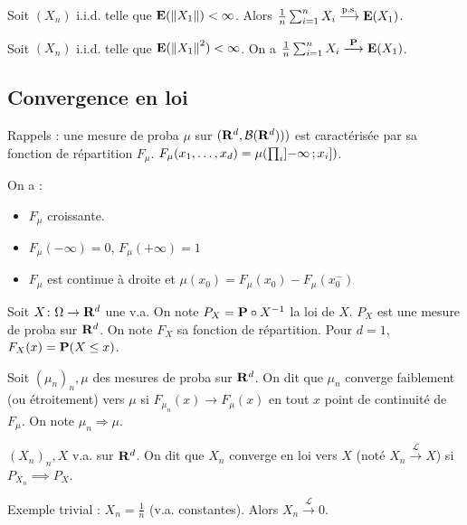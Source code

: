 	\begin{thm}
		Soit $(X_n)$ i.i.d. telle que $\mathbf{E}(\left\lVert X_1\right\rVert) < \infty$.
		Alors $\frac{1}{n} \sum_{i = 1}^n X_i \overset{\text{p.s.}}{\longrightarrow} \mathbf{E}(X_1)$.
	\end{thm}

	\begin{thm}
		Soit $(X_n)$ i.i.d. telle que $\mathbf{E}(\left\lVert X_1\right\rVert^2) < \infty$.
		On a $\frac{1}{n} \sum_{i = 1}^n X_i \overset{\mathbf{P}}{\longrightarrow} \mathbf{E}(X_1)$.
	\end{thm}


\subsection{Convergence en loi}

	Rappels : une mesure de proba $\mu$ sur $(\mathbf{R}^d, \mathcal{B}(\mathbf{R}^d)))$ est caractérisée par sa fonction de répartition $F_\mu$.
	$F_\mu(x_1,\ldots,x_d) = \mu(\prod_i \mathopen{}\mathclose{\left]-\infty\mathclose{}\mathpunct{};x_i\right]})$.
	
	On a :
	\begin{itemize}
		\item[\textbullet] $F_\mu$ croissante.
		\item[\textbullet] $F_\mu(-\infty) = 0$, $F_\mu(+\infty) = 1$
		\item[\textbullet] $F_\mu$ est continue à droite et $\mu({x_0}) = F_\mu(x_0) - F_\mu(x_0^-)$
	\end{itemize}

	Soit $X \colon \Omega \to \mathbf{R}^d$ une v.a.
	On note $P_X = \mathbf{P} \circ X^{-1}$ la loi de $X$.
	$P_X$ est une mesure de proba sur $\mathbf{R}^d$.
	On note $F_X$ sa fonction de répartition.
	Pour $d = 1$, $F_X(x) = \mathbf{P}(X \leq x)$.
	
	\begin{defn}
		Soit $(\mu_n)_n, \mu$ des mesures de proba sur $\mathbf{R}^d$.
		On dit que $\mu_n$ converge faiblement (ou étroitement) vers $\mu$ si $F_{\mu_n}(x) \longrightarrow F_\mu(x)$ en tout $x$ point de continuité de $F_\mu$.
		On note $\mu_n \Rightarrow \mu$.
	\end{defn}

	\begin{defn}
		$(X_n)_n, X$ v.a. sur $\mathbf{R}^d$.
		On dit que $X_n$ converge en loi vers $X$ (noté $X_n \overset{\mathcal{L}}{\longrightarrow} X$) si $P_{X_n} \implies P_X$.
	\end{defn}

	Exemple trivial : $X_n = \frac{1}{n}$ (v.a. constantes).
	Alors $X_n \overset{\mathcal{L}}{\longrightarrow} 0$.

